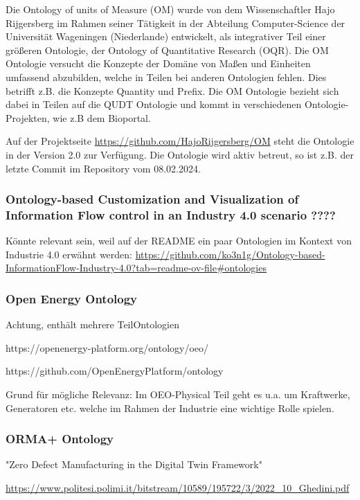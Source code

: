 \documentclass{article}
\begin{document}
Die Ontology of units of Measure (OM) wurde von dem Wissenschaftler Hajo Rijgersberg im Rahmen seiner Tätigkeit in der Abteilung Computer-Science der Universität Wageningen (Niederlande) entwickelt, als integrativer Teil einer größeren Ontologie\cite{rijgersberg2013ontology}, der Ontology of Quantitative Research (OQR).
Die OM Ontologie versucht die Konzepte der Domäne von Maßen und Einheiten umfassend abzubilden, welche in Teilen bei anderen Ontologien fehlen. Dies betrifft z.B. die Konzepte Quantity und Prefix. Die OM Ontologie bezieht sich dabei in Teilen auf die QUDT Ontologie und kommt in verschiedenen Ontologie-Projekten, wie z.B dem Bioportal\cite{OM_BioPortal}.

Auf der Projektseite \url{https://github.com/HajoRijgersberg/OM} steht die Ontologie in der Version 2.0 zur Verfügung. Die Ontologie wird aktiv betreut, so ist z.B. der letzte Commit im Repository vom 08.02.2024.

\subsubsection{Ontology-based Customization and Visualization of Information Flow control in an Industry 4.0 scenario ????}

Könnte relevant sein, weil auf der README ein paar Ontologien im Kontext von Industrie 4.0 erwähnt werden: \url{https://github.com/ko3n1g/Ontology-based-InformationFlow-Industry-4.0?tab=readme-ov-file#ontologies}

\subsubsection{Open Energy Ontology}

Achtung, enthält mehrere TeilOntologien

https://openenergy-platform.org/ontology/oeo/

https://github.com/OpenEnergyPlatform/ontology

Grund für mögliche Relevanz: Im OEO-Physical Teil geht es u.a. um Kraftwerke, Generatoren etc. welche im Rahmen der Industrie eine wichtige Rolle spielen.

\subsubsection{ORMA+ Ontology}

"Zero Defect Manufacturing in the Digital Twin Framework"

\url{https://www.politesi.polimi.it/bitstream/10589/195722/3/2022_10_Ghedini.pdf}
\end{document}
